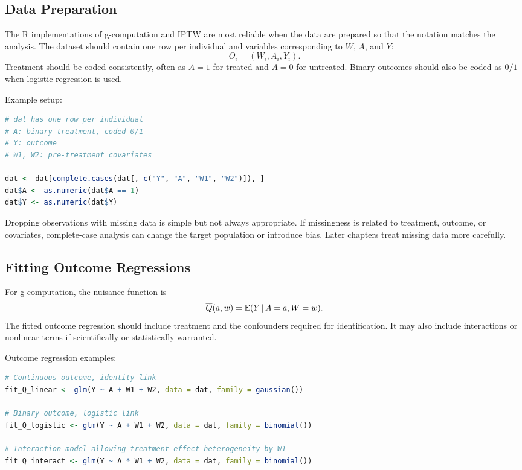 \label{lec:4-6}

\subsection{Data Preparation}

The R implementations of g-computation and IPTW are most reliable when the data are
prepared so that the notation matches the analysis. The dataset should contain one row
per individual and variables corresponding to $W$, $A$, and $Y$:
\[
O_i=(W_i,A_i,Y_i).
\]
Treatment should be coded consistently, often as $A=1$ for treated and $A=0$ for
untreated. Binary outcomes should also be coded as $0/1$ when logistic regression is
used.

\begin{implementationbox}
Example setup:
\begin{lstlisting}[language=R]
# dat has one row per individual
# A: binary treatment, coded 0/1
# Y: outcome
# W1, W2: pre-treatment covariates

dat <- dat[complete.cases(dat[, c("Y", "A", "W1", "W2")]), ]
dat$A <- as.numeric(dat$A == 1)
dat$Y <- as.numeric(dat$Y)
\end{lstlisting}
\end{implementationbox}

Dropping observations with missing data is simple but not always appropriate. If
missingness is related to treatment, outcome, or covariates, complete-case analysis can
change the target population or introduce bias. Later chapters treat missing data more
carefully.

\subsection{Fitting Outcome Regressions}

For g-computation, the nuisance function is
\[
\overline{Q}(a,w)=\mathbb{E}(Y\,\vert\, A=a,W=w).
\]
The fitted outcome regression should include treatment and the confounders required
for identification. It may also include interactions or nonlinear terms if scientifically
or statistically warranted.

\begin{implementationbox}
Outcome regression examples:
\begin{lstlisting}[language=R]
# Continuous outcome, identity link
fit_Q_linear <- glm(Y ~ A + W1 + W2, data = dat, family = gaussian())

# Binary outcome, logistic link
fit_Q_logistic <- glm(Y ~ A + W1 + W2, data = dat, family = binomial())

# Interaction model allowing treatment effect heterogeneity by W1
fit_Q_interact <- glm(Y ~ A * W1 + W2, data = dat, family = binomial())
\end{lstlisting}
\end{implementationbox}

